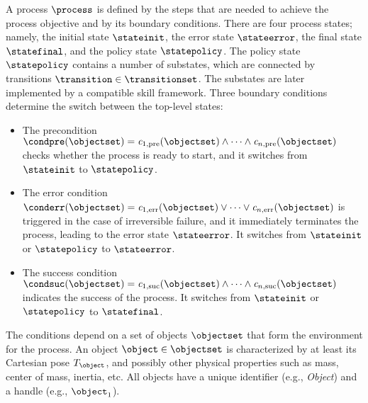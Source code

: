A process $\process$ is defined by the steps that are needed to achieve the process objective and by its boundary conditions.
There are four process states; namely, the initial state $\stateinit$, the error state $\stateerror$, the final state $\statefinal$, and the policy state $\statepolicy$.
The policy state $\statepolicy$ contains a number of substates, which are connected by transitions $\transition \in \transitionset$.
The substates are later implemented by a compatible skill framework.
Three boundary conditions determine the switch between the top-level states:
\begin{itemize}
\item The precondition $\condpre(\objectset)=\mathit{c}_{1,\text{pre}}(\objectset) \land \dots \land \mathit{c}_{n,\text{pre}}(\objectset)$ checks whether the process is ready to start, and it switches from $\stateinit$ to $\statepolicy$.
\item The error condition $\conderr(\objectset) = \mathit{c}_{1,\text{err}}(\objectset) \lor \dots \lor \mathit{c}_{n,\text{err}}(\objectset)$ is triggered in the case of irreversible failure, and it immediately terminates the process, leading to the error state $\stateerror$. It switches from $\stateinit$ or $\statepolicy$ to $\stateerror$.
\item The success condition $\condsuc(\objectset) = \mathit{c}_{1,\text{suc}}(\objectset) \land \dots \land \mathit{c}_{n,\text{suc}}(\objectset)$ indicates the success of the process. It switches from $\stateinit$ or $\statepolicy$ to $\statefinal$.
\end{itemize}

The conditions depend on a set of objects $\objectset$ that form the environment for the process.
An object $\object \in \objectset$ is characterized by at least its Cartesian pose $T_{\object}$, and possibly other physical properties such as mass, center of mass, inertia, etc.
All objects have a unique identifier (e.g., \textit{Object}) and a handle (e.g., $\object_1$).
